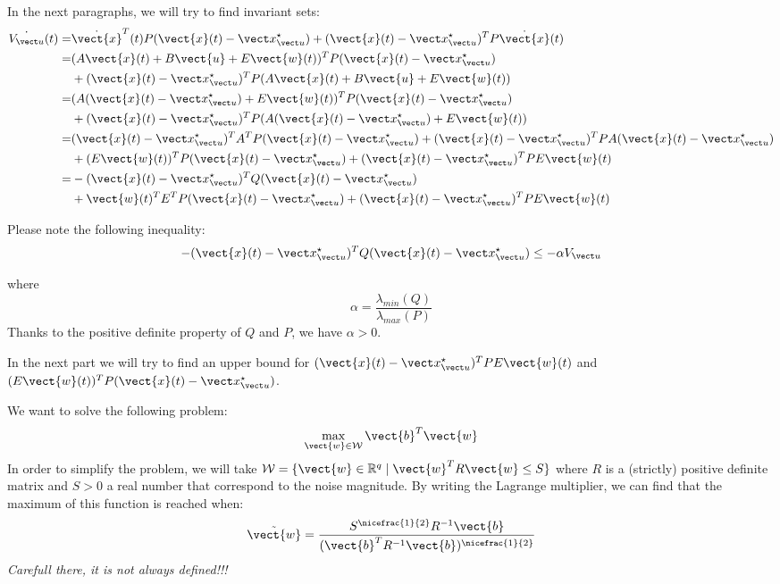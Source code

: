 In the next paragraphs, we will try to find invariant sets:
\begin{align*}
\dot{\Vu}(t) =& \dot{\vect{x}}^T(t) P (\vect{x}(t) - \xu) +  (\vect{x}(t) - \xu)^T P \dot{\vect{x}}(t)
\\
 =& (A \vect{x}(t) + B \vect{u} + E \vect{w}(t))^T P (\vect{x}(t) - \xu)\\
 & + (\vect{x}(t) - \xu)^T P (A \vect{x}(t) + B \vect{u} + E \vect{w}(t))
\\
 =& (A (\vect{x}(t) - \xu) + E \vect{w}(t))^T P (\vect{x}(t) - \xu)\\
 & +(\vect{x}(t) - \xu)^T P (A (\vect{x}(t) - \xu)+ E \vect{w}(t))
\\
 =& (\vect{x}(t) - \xu)^T A^T P (\vect{x}(t) - \xu) +  (\vect{x}(t) - \xu)^T P A (\vect{x}(t) - \xu)\\
 & + (E \vect{w}(t))^T P (\vect{x}(t) - \xu) +  (\vect{x}(t) - \xu)^T P E \vect{w}(t)
\\
 =& - (\vect{x}(t) - \xu)^T Q (\vect{x}(t) - \xu)\\
 & +\vect{w}(t)^T E^T P (\vect{x}(t) - \xu) +  (\vect{x}(t) - \xu)^T P E \vect{w}(t)\\
\end{align*}

Please note the following inequality:
\begin{equation}
- (\vect{x}(t) - \xu)^T Q (\vect{x}(t) - \xu) \leq - \alpha \Vu
\end{equation}

where
\begin{equation}
\alpha = \frac{\lambda_{min}(Q)}{\lambda_{max}(P)}
\end{equation}
Thanks to the positive definite property of $Q$ and $P$, we have $\alpha>0$.

In the next part we will try to find an upper bound for $(\vect{x}(t) - \xu)^T P E \vect{w}(t)$ and $(E \vect{w}(t))^T P (\vect{x}(t) - \xu)$.

We want to solve the following problem:
\begin{equation} \label{eq:max_w}
\max_{\vect{w} \in \mathcal{W}} \vect{b}^T \vect{w}
\end{equation}
In order to simplify the problem, we will take $\mathcal{W} = \{ \vect{w} \in \mathbb{R}^q \mid \vect{w}^T R \vect{w} \leq S\}$ where $R$ is a (strictly) positive definite matrix and $S>0$ a real number that correspond to the noise magnitude.
By writing the Lagrange multiplier, we can find that the maximum of this function is reached when:
\begin{equation}
\tilde{\vect{w}} = \frac{S^{\nicefrac{1}{2}} R^{-1} \vect{b}}{(\vect{b}^T R^{-1} \vect{b})^{\nicefrac{1}{2}}}
\end{equation}
\textit{Carefull there, it is not always defined!!!}

